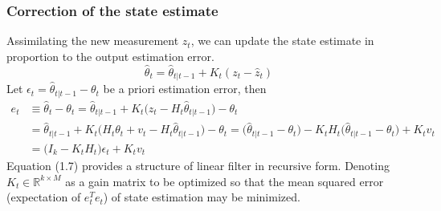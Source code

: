\documentclass[a4 paper]{article}
\begin{document}
\subsubsection{Correction of the state estimate} 
\par Assimilating the new measurement $z_t$, we can update the state estimate in proportion to the output estimation error.
\begin{equation}
    \hat{\theta}_t=\hat{\theta}_{t|t-1}+K_{t}(z_t-\hat{z}_t)
\end{equation}
Let $\epsilon_t=\hat{\theta}_{t|t-1}-\theta_t$ be a priori estimation error, then
\begin{equation}
\begin{split}
    e_t&\equiv\hat{\theta}_t-\theta_t=\hat{\theta}_{t|t-1}+K_t\big(z_t-H_t\hat{\theta}_{t|t-1}\big)-\theta_t\\
    &=\hat{\theta}_{t|t-1}+K_t\big(H_{t}\theta_t+v_t-H_t\hat{\theta}_{t|t-1}\big)-\theta_t=\big(\hat{\theta}_{t|t-1}-\theta_t\big)-K_{t}H_t\big(\hat{\theta}_{t|t-1}-\theta_t\big)+K_{t}v_t\\
    &=\big(I_k-K_tH_t\big)\epsilon_t+K_tv_t
\end{split}
\end{equation}
Equation (1.7) provides a structure of linear filter in recursive form. Denoting $K_t\in\mathbb{R}^{k\times M}$ as a gain 
matrix to be optimized so that the mean squared error (expectation of $e_t^Te_t$) of state estimation may be minimized.
\end{document}
